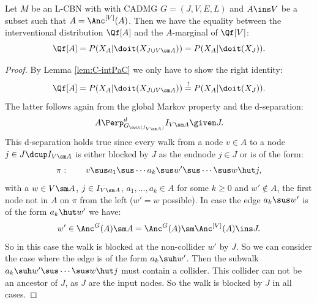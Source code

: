 \begin{Lem}
    \label{lem:int-anc}
    Let $M$ be an L-CBN with with \observational CADMG $G=(J,V,E,L)$ and $A \ins V$ be a subset such that 
    $A=\Anc^{[V]}(A)$.
    Then we have the equality between the interventional distribution $\Qf[A]$ and the $A$-marginal of $\Qf[V]$:
            \[ \Qf[A] = P(X_A|\doit(X_{J \cup V \sm A})) = P(X_A|\doit(X_J)). \]
    \begin{proof}
        By Lemma \ref{lem:C-intPaC} we only have to show the right identity:
        \[ \Qf[A] = P(X_A|\doit(X_{J \cup V \sm A})) \stackrel{!}{=} P(X_A|\doit(X_J)). \]
       The latter follows again from the global Markov property and the d-separation:
       \[ A \Perp^d_{G_{\doit(I_{V \sm A})}} I_{V \sm A} \given J.  \]
       This d-separation holds true since every walk from a node $v \in A$ to a node $j \in J \dcup I_{V \sm A}$ is either blocked by $J$ as the endnode $j \in J$ or is of the form:
       \[\pi:\qquad v \sus a_1 \sus \cdots a_k \sus w' \sus \cdots \sus w \hut j,\]
       with a $ w \in V \sm A$, $j \in I_{V\sm A}$, $a_1,\dots, a_k \in A$ for some $k \ge 0$ and $w' \notin A$, the first node not in $A$ on $\pi$ from the left ($w'=w$ possible).
       In case the edge $a_k \sus w'$ is of the form $a_k \hut w'$ we have:
       \[w' \in \Anc^G(A) \sm A = \Anc^G(A) \sm \Anc^{[V]}(A)  \ins J.\] 
      So in this case the walk is blocked at the non-collider $w'$ by $J$. 
       So we can consider the case where the edge is of the form $a_k \suh w'$.
       Then the subwalk $a_k \suh w' \sus \cdots \sus w \hut j$ must contain a collider. This collider can not be an ancestor of $J$, as $J$ are the input nodes. So the walk is blocked by $J$ in all cases.
    \end{proof}
\end{Lem}

